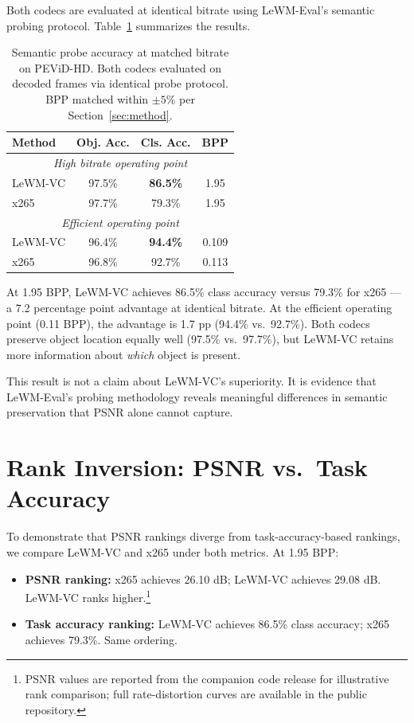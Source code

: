 \documentclass{article}
\begin{document}
Both codecs are evaluated at identical bitrate using LeWM-Eval's semantic probing protocol. Table~\ref{tab:probe} summarizes the results.

\begin{table}[ht]
\centering
\caption{Semantic probe accuracy at matched bitrate on PEViD-HD. Both codecs evaluated on decoded frames via identical probe protocol. BPP matched within $\pm 5\%$ per Section~\ref{sec:method}.}
\label{tab:probe}
\begin{tabular}{lccc}
\toprule
\textbf{Method} & \textbf{Obj. Acc.} & \textbf{Cls. Acc.} & \textbf{BPP} \\
\midrule
\multicolumn{4}{c}{\textit{High bitrate operating point}} \\
LeWM-VC & 97.5\% & \textbf{86.5\%} & 1.95 \\
x265 & 97.7\% & 79.3\% & 1.95 \\
\midrule
\multicolumn{4}{c}{\textit{Efficient operating point}} \\
LeWM-VC & 96.4\% & \textbf{94.4\%} & 0.109 \\
x265 & 96.8\% & 92.7\% & 0.113 \\
\bottomrule
\end{tabular}
\end{table}

At 1.95 BPP, LeWM-VC achieves 86.5\% class accuracy versus 79.3\% for x265 --- a 7.2 percentage point advantage at identical bitrate. At the efficient operating point (0.11 BPP), the advantage is 1.7 pp (94.4\% vs.\ 92.7\%). Both codecs preserve object location equally well (97.5\% vs.\ 97.7\%), but LeWM-VC retains more information about \textit{which} object is present.

This result is not a claim about LeWM-VC's superiority. It is evidence that LeWM-Eval's probing methodology reveals meaningful differences in semantic preservation that PSNR alone cannot capture.

\section{Rank Inversion: PSNR vs.\ Task Accuracy}
\label{sec:rank_inversion}

To demonstrate that PSNR rankings diverge from task-accuracy-based rankings, we compare LeWM-VC and x265 under both metrics. At 1.95 BPP:

\begin{itemize}
\item \textbf{PSNR ranking:} x265 achieves 26.10 dB; LeWM-VC achieves 29.08 dB. LeWM-VC ranks higher.\footnote{PSNR values are reported from the companion code release for illustrative rank comparison; full rate-distortion curves are available in the public repository.}
\item \textbf{Task accuracy ranking:} LeWM-VC achieves 86.5\% class accuracy; x265 achieves 79.3\%. Same ordering.
\end{itemize}
\end{document}
